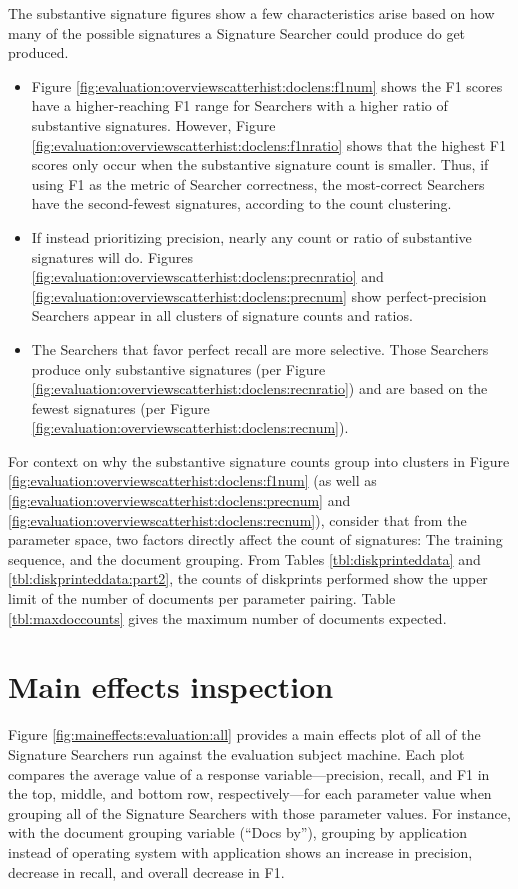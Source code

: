 \documentclass[11pt]{ucthesis}
\theoremstyle{plain}
\theoremstyle{definition}
\begin{document}
The substantive signature figures show a few characteristics arise based on how many of the possible signatures a Signature Searcher could produce do get produced.

\begin{itemize}
\item Figure \ref{fig:evaluation:overviewscatterhist:doclens:f1num} shows the F1 scores have a higher-reaching F1 range for Searchers with a higher ratio of substantive signatures.  However, Figure \ref{fig:evaluation:overviewscatterhist:doclens:f1nratio} shows that the highest F1 scores only occur when the substantive signature count is smaller.  Thus, if using F1 as the metric of Searcher correctness, the most-correct Searchers have the second-fewest signatures, according to the count clustering.
\item If instead prioritizing precision, nearly any count or ratio of substantive signatures will do.  Figures \ref{fig:evaluation:overviewscatterhist:doclens:precnratio} and \ref{fig:evaluation:overviewscatterhist:doclens:precnum} show perfect-precision Searchers appear in all clusters of signature counts and ratios.
\item The Searchers that favor perfect recall are more selective.  Those Searchers produce only substantive signatures (per Figure \ref{fig:evaluation:overviewscatterhist:doclens:recnratio}) and are based on the fewest signatures (per Figure \ref{fig:evaluation:overviewscatterhist:doclens:recnum}).
\end{itemize}

For context on why the substantive signature counts group into clusters in Figure \ref{fig:evaluation:overviewscatterhist:doclens:f1num} (as well as \ref{fig:evaluation:overviewscatterhist:doclens:precnum} and \ref{fig:evaluation:overviewscatterhist:doclens:recnum}), consider that from the parameter space, two factors directly affect the count of signatures: The training sequence, and the document grouping.  From Tables \ref{tbl:diskprinteddata} and \ref{tbl:diskprinteddata:part2}, the counts of diskprints performed show the upper limit of the number of documents per parameter pairing.  Table \ref{tbl:maxdoccounts} gives the maximum number of documents expected.


\section{Main effects inspection}

Figure \ref{fig:maineffects:evaluation:all} provides a main effects plot \cite{box:wiley78} of all of the Signature Searchers run against the evaluation subject machine.  Each plot compares the average value of a response variable---precision, recall, and F1 in the top, middle, and bottom row, respectively---for each parameter value when grouping all of the Signature Searchers with those parameter values.  For instance, with the document grouping variable (``Docs by''), grouping by application instead of operating system with application shows an increase in precision, decrease in recall, and overall decrease in F1.
\end{document}
